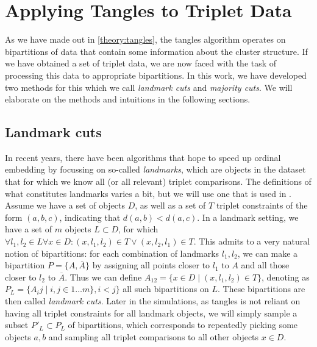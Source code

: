 \section{Applying Tangles to Triplet Data}
As we have made out in \autoref{theory:tangles}, the tangles algorithm operates on bipartitions of data that contain some information about the cluster structure.
If we have obtained a set of triplet data, we are now faced with the task of processing this data to appropriate bipartitions. In this work, we have developed two
methods for this which we call \textit{landmark cuts} and \textit{majority cuts}. We will elaborate on the methods and intuitions in the following sections.

\subsection{Landmark cuts}\label{theory:landmark_cuts}
In recent years, there have been algorithms that hope to speed up ordinal embedding by focussing on so-called \textit{landmarks}\cite{ghoshLandmarkOrdinalEmbedding2019, andertonScalingOrdinalEmbedding2019}, which are objects in the dataset that for which we know all (or all relevant) triplet comparisons.
The definitions of what constitutes landmarks varies a bit, but we will use one that is used in \cite{haghiriComparisonBasedFrameworkPsychophysics2019}.
Assume we have a set of objects $D$, as well as a set of $T$ triplet constraints of the form $(a,b,c)$, indicating that $d(a,b) < d(a,c)$. In a landmark setting, we have a set 
of $m$ objects $L \subset D$, for which $\forall l_1, l_2 \in L \forall x \in D: (x, l_1, l_2) \in T \vee (x, l_2, l_1) \in T$. This admits to a very natural notion of bipartitions: 
for each combination of landmarks $l_1, l_2$, we can make a bipartition $P = \{A, \overline{A}\}$ by assigning all points closer to $l_1$ to $A$ and all 
those closer to $l_2$ to $\overline{A}$. Thus we can define $A_{12} = \{ x \in D \mid \left( x, l_1, l_2 \right) \in T \}$, denoting as $P_L = \{A_ij  \mid i, j \in 1\ldots m\}, i < j\}$ 
all such bipartitions on $L$. These bipartitions are then called \textit{landmark cuts}.
Later in the simulations, as tangles is not reliant on having all triplet constraints for all landmark objects, we will simply sample a subset $P'_{L} \subset P_L$ of bipartitions,
which corresponds to repeatedly picking some objects $a, b$ and sampling all triplet comparisons to all other objects $x \in D$. \\

